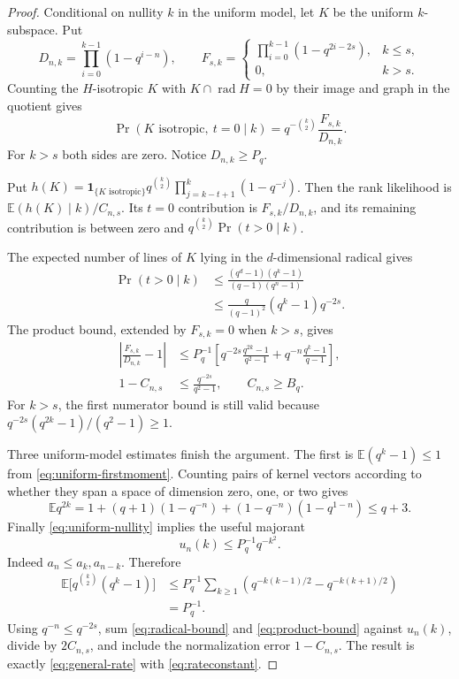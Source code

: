 \documentclass[11pt]{article}
\newcommand{\rad}{\operatorname{rad}}
\newcommand{\E}{\mathbb E}
\newcommand{\1}{\mathbf 1}
\theoremstyle{definition}
\theoremstyle{remark}
\numberwithin{equation}{section}
\begin{document}
\begin{proof}
Conditional on nullity $k$ in the uniform model, let $K$ be the uniform $k$-subspace. Put
\[
D_{n,k}=\prod_{i=0}^{k-1}(1-q^{i-n}),\qquad
F_{s,k}=\begin{cases}\prod_{i=0}^{k-1}(1-q^{2i-2s}),&k\le s,\\0,&k>s.\end{cases}
\]
Counting the $H$-isotropic $K$ with $K\cap\rad H=0$ by their image and graph in the quotient gives
\begin{equation}\label{eq:transverse-prob}
\Pr(K\text{ isotropic},\ t=0\mid k)
=q^{-\binom{k}{2}}\frac{F_{s,k}}{D_{n,k}}.
\end{equation}
For $k>s$ both sides are zero. Notice $D_{n,k}\ge P_q$.

Put $h(K)=\1_{\{K\text{ isotropic}\}}q^{\binom{k}{2}}
\prod_{j=k-t+1}^k(1-q^{-j})$. Then the rank likelihood is
$\E(h(K)\mid k)/C_{n,s}$. Its $t=0$ contribution is $F_{s,k}/D_{n,k}$, and its remaining contribution is between zero and
$q^{\binom{k}{2}}\Pr(t>0\mid k)$.

The expected number of lines of $K$ lying in the $d$-dimensional radical gives
\begin{align}
\Pr(t>0\mid k)
&\le\frac{(q^d-1)(q^k-1)}{(q-1)(q^n-1)}\nonumber\\
&\le\frac{q}{(q-1)^2}(q^k-1)q^{-2s}.\label{eq:radical-bound}
\end{align}
The product bound, extended by $F_{s,k}=0$ when $k>s$, gives
\begin{align}
\left|\frac{F_{s,k}}{D_{n,k}}-1\right|
&\le P_q^{-1}\left[q^{-2s}\frac{q^{2k}-1}{q^2-1}
 +q^{-n}\frac{q^k-1}{q-1}\right],\label{eq:product-bound}\\
1-C_{n,s}&\le\frac{q^{-2s}}{q^2-1},\qquad C_{n,s}\ge B_q.\nonumber
\end{align}
For $k>s$, the first numerator bound is still valid because
$q^{-2s}(q^{2k}-1)/(q^2-1)\ge1$.

Three uniform-model estimates finish the argument. The first is
$\E(q^k-1)\le1$ from \eqref{eq:uniform-firstmoment}. Counting pairs of kernel vectors according to whether they span a space of dimension zero, one, or two gives
\[
\E q^{2k}=1+(q+1)(1-q^{-n})
 +(1-q^{-n})(1-q^{1-n})\le q+3.
\]
Finally \eqref{eq:uniform-nullity} implies the useful majorant
\[
u_n(k)\le P_q^{-1}q^{-k^2}.
\]
Indeed $a_n\le a_k,a_{n-k}$. Therefore
\begin{align*}
\E\bigl[q^{\binom{k}{2}}(q^k-1)\bigr]
&\le P_q^{-1}\sum_{k\ge1}
\left(q^{-k(k-1)/2}-q^{-k(k+1)/2}\right)\\
&=P_q^{-1}.
\end{align*}
Using $q^{-n}\le q^{-2s}$, sum \eqref{eq:radical-bound} and \eqref{eq:product-bound} against $u_n(k)$, divide by $2C_{n,s}$, and include the normalization error $1-C_{n,s}$. The result is exactly \eqref{eq:general-rate} with \eqref{eq:rateconstant}.


\end{proof}
\end{document}
